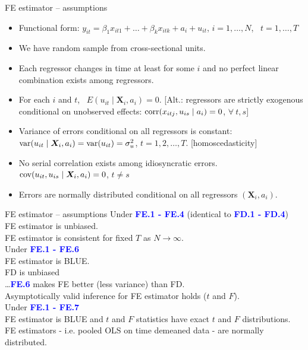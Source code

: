 \documentclass[usenames,dvipsnames]{beamer}
\begin{document}
\begin{frame}{FE estimator – assumptions}
\begin{itemize}
\item[\textbf{FE.1}] Functional form: $y_{it} = \beta_1 x_{it1} + \dots + \beta_k x_{itk} + a_i + u_{it}$, $i = 1, \dots, N$, \ $t = 1, \dots, T$
\item[\textbf{FE.2}] We have random sample from cross-sectional units.
\item[\textbf{FE.3}] Each regressor changes in time at least for some $i$ and no perfect linear combination exists among regressors.
\item[\textbf{FE.4}] For each $i$ and $t$, \ $E (u_{it} \mid \bm{X}_i, a_i) = 0$. [Alt.: regressors are strictly exogenous conditional on unobserved effects: $\textnormal{corr}(x_{itj}, u_{is} \mid a_i)=0$, \quad $\forall \ t, s$]
\item[\textbf{FE.5}] Variance of errors conditional on all regressors is constant: $\textnormal{var}(u_{it} \mid \bm{X}_i, a_i) = \textnormal{var}(u_{it}) = \sigma^2_u$, \quad $t= 1,2, \dots, T$. [homoscedasticity]
\item[\textbf{FE.6}] No serial correlation exists among idiosyncratic errors. $\textnormal{cov}(u_{it}, u_{is} \mid \bm{X}_i, a_i) = 0$, \quad $t \neq s$
\item[\textbf{FE.7}] Errors are normally distributed conditional on all regressors $(\bm{X}_i, a_i)$.
\end{itemize}
\end{frame}
\begin{frame}{FE estimator – assumptions}
Under \textcolor{blue}{\textbf{FE.1 - FE.4}} (identical to  \textcolor{blue}{\textbf{FD.1 - FD.4}})\\
FE estimator is unbiased. \\
FE estimator is consistent for fixed $T$ as $N \rightarrow \infty$.\\
\vspace{0.5cm}
Under \textcolor{blue}{\textbf{FE.1 - FE.6}}\\
FE estimator is BLUE.\\
FD is unbiased\\ \dots  \textcolor{blue}{\textbf{FE.6}} makes FE better (less variance) than FD.\\
Asymptotically valid inference for FE estimator holds ($t$ and $F$).\\
\vspace{0.5cm}
Under  \textcolor{blue}{\textbf{FE.1 - FE.7}}\\
FE estimator is BLUE and $t$ and $F$ statistics have exact $t$ and $F$ distributions.\\
FE estimators - i.e. pooled OLS on time demeaned data - are normally distributed.
\end{frame}
\end{document}
